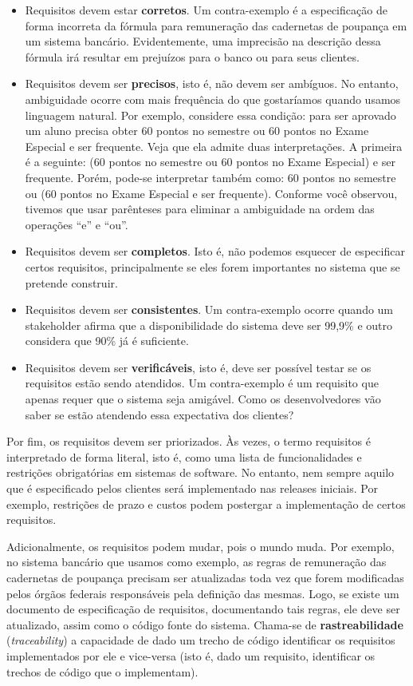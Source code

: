 \documentclass[
  11pt,
  twoside]{book}
\begin{document}
\begin{itemize}
\item
  Requisitos devem estar \textbf{corretos}. Um contra-exemplo é a
  especificação de forma incorreta da fórmula para remuneração das
  cadernetas de poupança em um sistema bancário. Evidentemente, uma
  imprecisão na descrição dessa fórmula irá resultar em prejuízos para o
  banco ou para seus clientes.
\item
  Requisitos devem ser \textbf{precisos}, isto é, não devem ser
  ambíguos. No entanto, ambiguidade ocorre com mais frequência do que
  gostaríamos quando usamos linguagem natural. Por exemplo, considere
  essa condição: para ser aprovado um aluno precisa obter 60 pontos no
  semestre ou 60 pontos no Exame Especial e ser frequente. Veja que ela
  admite duas interpretações. A primeira é a seguinte: (60 pontos no
  semestre ou 60 pontos no Exame Especial) e ser frequente. Porém,
  pode-se interpretar também como: 60 pontos no semestre ou (60 pontos
  no Exame Especial e ser frequente). Conforme você observou, tivemos
  que usar parênteses para eliminar a ambiguidade na ordem das operações
  ``e'' e ``ou''.
\item
  Requisitos devem ser \textbf{completos}. Isto é, não podemos esquecer
  de especificar certos requisitos, principalmente se eles forem
  importantes no sistema que se pretende construir.
\item
  Requisitos devem ser \textbf{consistentes}. Um contra-exemplo ocorre
  quando um stakeholder afirma que a disponibilidade do sistema deve ser
  99,9\% e outro considera que 90\% já é suficiente.
\item
  Requisitos devem ser \textbf{verificáveis}, isto é, deve ser possível
  testar se os requisitos estão sendo atendidos. Um contra-exemplo é um
  requisito que apenas requer que o sistema seja amigável. Como os
  desenvolvedores vão saber se estão atendendo essa expectativa dos
  clientes?
\end{itemize}

Por fim, os requisitos devem ser priorizados. Às vezes, o termo
requisitos é interpretado de forma literal, isto é, como uma lista de
funcionalidades e restrições obrigatórias em sistemas de software. No
entanto, nem sempre aquilo que é especificado pelos clientes será
implementado nas releases iniciais. Por exemplo, restrições de prazo e
custos podem postergar a implementação de certos requisitos.

Adicionalmente, os requisitos podem mudar, pois o mundo muda. Por
exemplo, no sistema bancário que usamos como exemplo, as regras de
remuneração das cadernetas de poupança precisam ser atualizadas toda vez
que forem modificadas pelos órgãos federais responsáveis pela definição
das mesmas. Logo, se existe um documento de especificação de requisitos,
documentando tais regras, ele deve ser atualizado, assim como o código
fonte do sistema. Chama-se de \textbf{rastreabilidade}
(\emph{traceability}) a capacidade de dado um trecho de código
identificar os requisitos implementados por ele e vice-versa (isto é,
dado um requisito, identificar os trechos de código que o implementam).
\end{document}
